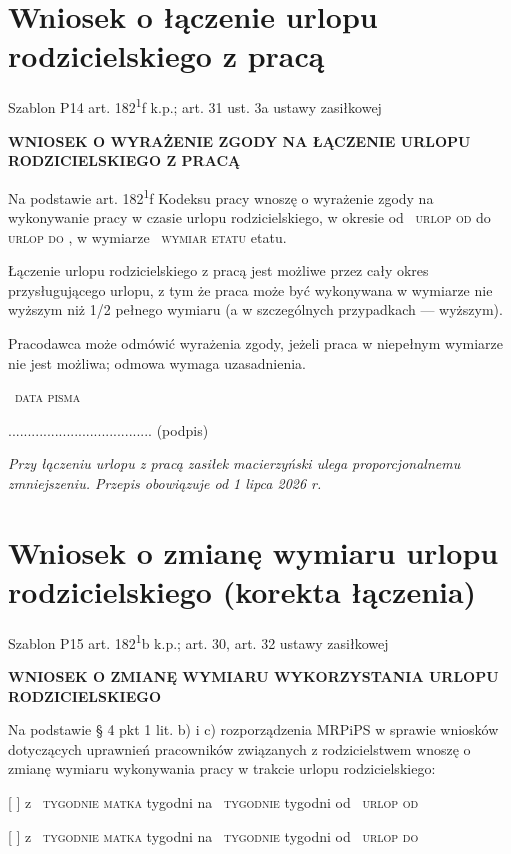 \documentclass[11pt,a4paper]{article}
\newcommand{\Pole}[1]{%
  \textcolor{szary}{\dotfill}\,%
  {\scriptsize\textcolor{szary}{\textsc{#1}}}%
}
\newcommand{\NaglowekPisma}[1]{%
  \par\vspace{0.8em}%
  \begin{center}%
    {\large\bfseries\MakeUppercase{#1}}%
  \end{center}%
  \vspace{0.4em}%
}
\begin{document}
\clearpage

\section{Wniosek o łączenie urlopu rodzicielskiego z pracą}

{\small\color{szary}Szablon P14 \textbullet{} art. 182\textsuperscript{1}f k.p.; art. 31 ust. 3a ustawy zasiłkowej}

\NaglowekPisma{WNIOSEK O WYRAŻENIE ZGODY NA ŁĄCZENIE URLOPU RODZICIELSKIEGO Z PRACĄ}

Na podstawie art. 182\textsuperscript{1}f Kodeksu pracy wnoszę o wyrażenie zgody na wykonywanie
pracy w czasie urlopu rodzicielskiego, w okresie od \Pole{urlop od} do \Pole{urlop do},
w wymiarze \Pole{wymiar etatu} etatu.

Łączenie urlopu rodzicielskiego z pracą jest możliwe przez cały okres
przysługującego urlopu, z tym że praca może być wykonywana w wymiarze
nie wyższym niż 1/2 pełnego wymiaru (a w szczególnych przypadkach --- wyższym).

Pracodawca może odmówić wyrażenia zgody, jeżeli praca w niepełnym wymiarze
nie jest możliwa; odmowa wymaga uzasadnienia.

\Pole{data pisma}
.....................................
(podpis)

\vfill
{\footnotesize\color{szary}\itshape Przy łączeniu urlopu z pracą zasiłek macierzyński ulega proporcjonalnemu zmniejszeniu. Przepis obowiązuje od 1 lipca 2026 r. }

\clearpage

\section{Wniosek o zmianę wymiaru urlopu rodzicielskiego (korekta łączenia)}

{\small\color{szary}Szablon P15 \textbullet{} art. 182\textsuperscript{1}b k.p.; art. 30, art. 32 ustawy zasiłkowej}

\NaglowekPisma{WNIOSEK O ZMIANĘ WYMIARU WYKORZYSTANIA URLOPU RODZICIELSKIEGO}

Na podstawie \S{} 4 pkt 1 lit. b) i c) rozporządzenia MRPiPS w sprawie wniosków
dotyczących uprawnień pracowników związanych z rodzicielstwem wnoszę o zmianę
wymiaru wykonywania pracy w trakcie urlopu rodzicielskiego:

[ ] z \Pole{tygodnie matka} tygodni na \Pole{tygodnie} tygodni od \Pole{urlop od}
[ ] z \Pole{tygodnie matka} tygodni na \Pole{tygodnie} tygodni od \Pole{urlop do}
\end{document}
